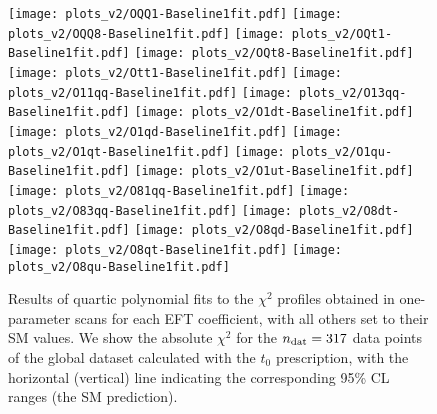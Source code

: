 \begin{figure}[htbp]
  \begin{center}
    \texttt{[image: plots\_v2/OQQ1-Baseline1fit.pdf]}
\texttt{[image: plots\_v2/OQQ8-Baseline1fit.pdf]}
\texttt{[image: plots\_v2/OQt1-Baseline1fit.pdf]}
\texttt{[image: plots\_v2/OQt8-Baseline1fit.pdf]}
\texttt{[image: plots\_v2/Ott1-Baseline1fit.pdf]}
\texttt{[image: plots\_v2/O11qq-Baseline1fit.pdf]}
\texttt{[image: plots\_v2/O13qq-Baseline1fit.pdf]}
\texttt{[image: plots\_v2/O1dt-Baseline1fit.pdf]}
\texttt{[image: plots\_v2/O1qd-Baseline1fit.pdf]}
\texttt{[image: plots\_v2/O1qt-Baseline1fit.pdf]}
\texttt{[image: plots\_v2/O1qu-Baseline1fit.pdf]}
\texttt{[image: plots\_v2/O1ut-Baseline1fit.pdf]}
\texttt{[image: plots\_v2/O81qq-Baseline1fit.pdf]}
\texttt{[image: plots\_v2/O83qq-Baseline1fit.pdf]}
\texttt{[image: plots\_v2/O8dt-Baseline1fit.pdf]}
\texttt{[image: plots\_v2/O8qd-Baseline1fit.pdf]}
\texttt{[image: plots\_v2/O8qt-Baseline1fit.pdf]}
\texttt{[image: plots\_v2/O8qu-Baseline1fit.pdf]}
\caption{\small Results of quartic polynomial fits
  to the $\chi^2$ profiles obtained  in one-parameter scans
  for each EFT coefficient, with all others set to their
  SM values.
  We show the absolute $\chi^2$ for the  $n_{\rm dat}=317$ data points
  of the global dataset calculated with the $t_0$ prescription,
  with the horizontal (vertical) line indicating the
  corresponding 95\% CL ranges (the SM prediction).
     \label{fig:quartic-individual-fits} }
  \end{center}
\end{figure}


